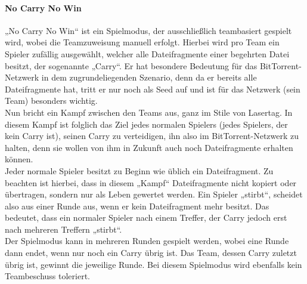 \paragraph{No Carry No Win}
„No Carry No Win“ ist ein Spielmodus, der ausschließlich teambasiert gespielt wird, wobei die Teamzuweisung manuell erfolgt. Hierbei wird pro Team ein Spieler zufällig ausgewählt, welcher alle Dateifragmente einer begehrten Datei besitzt, der sogenannte „Carry“. Er hat besondere Bedeutung für das BitTorrent-Netzwerk in dem zugrundeliegenden Szenario, denn da er bereits alle Dateifragmente hat, tritt er nur noch als Seed auf und ist für das Netzwerk (sein Team) besonders wichtig. \\
Nun bricht ein Kampf zwischen den Teams aus, ganz im Stile von Lasertag. In diesem Kampf ist folglich das Ziel jedes normalen Spielers (jedes Spielers, der kein Carry ist), seinen Carry zu verteidigen, ihn also im BitTorrent-Netzwerk zu halten, denn sie wollen von ihm in Zukunft auch noch Dateifragmente erhalten können. \\
Jeder normale Spieler besitzt zu Beginn wie üblich ein Dateifragment. Zu beachten ist hierbei, dass in diesem „Kampf“ Dateifragmente nicht kopiert oder übertragen, sondern nur als Leben gewertet werden. Ein Spieler „stirbt“, scheidet also aus einer Runde aus, wenn er kein Dateifragment mehr besitzt. Das bedeutet, dass ein normaler Spieler nach einem Treffer, der Carry jedoch erst nach mehreren Treffern „stirbt“. \\
Der Spielmodus kann in mehreren Runden gespielt werden, wobei eine Runde dann endet, wenn nur noch ein Carry übrig ist. Das Team, dessen Carry zuletzt übrig ist, gewinnt die jeweilige Runde.
Bei diesem Spielmodus wird ebenfalls kein Teambeschuss toleriert.

